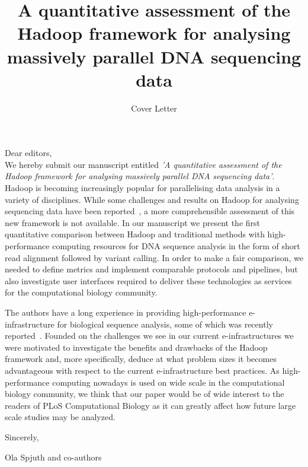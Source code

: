\documentclass[11pt]{article}
\begin{document}
\title{A quantitative assessment of the Hadoop framework for analysing massively parallel DNA sequencing data}
\author{Cover Letter}
\date{}
\maketitle

Dear editors,\\

We hereby submit our manuscript entitled \textit{'A quantitative assessment of the Hadoop framework for analysing massively parallel DNA sequencing data'}. Hadoop is becoming increasingly popular for parallelising data analysis in a variety of disciplines. While some challenges and results on Hadoop for analysing sequencing data have been reported~\cite{Marx:2013fk,gatk}, a more comprehensible assessment of this new framework is not available. In our manuscript we present the first quantitative comparison between Hadoop and traditional methods with high-performance computing resources for DNA sequence analysis in the form of short read alignment followed by variant calling. In order to make a fair comparison, we needed to define metrics and implement comparable protocols and pipelines, but also investigate user interfaces required to deliver these technologies as services for the computational biology community.

The authors have a long experience in providing high-performance e-infrastructure for biological sequence analysis, some of which was recently reported~\cite{lampa,Pireddu:2011vn}. Founded on the challenges we see in our current e-infrastructures we were motivated to investigate the benefits and drawbacks of the Hadoop framework and, more specifically, deduce at what problem sizes it becomes advantageous with respect to the current e-infrastructure best practices. As high-performance computing nowadays is used on wide scale in the computational biology community, we think that our paper would be of wide interest to the readers of PLoS Computational Biology as it can greatly affect how future large scale studies may be analyzed.
 
Sincerely,
 
Ola Spjuth and co-authors

\scriptsize



 
\end{document}
